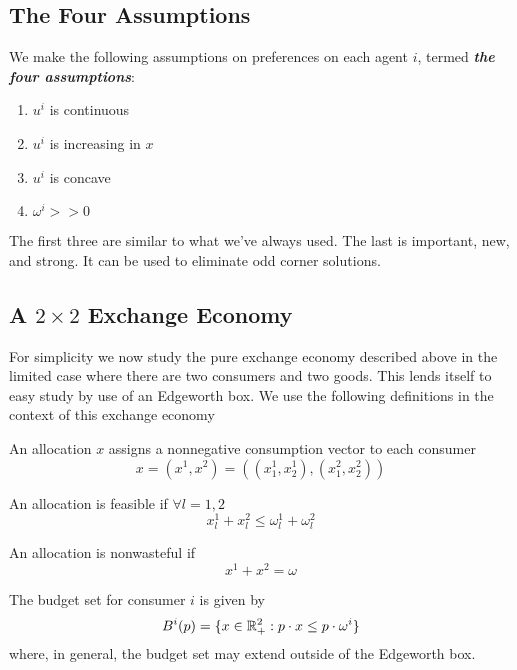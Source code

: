 \subsection{The Four Assumptions}
\label{sec:four-assumptions}

We make the following assumptions on preferences on each agent $i$,
termed \textbf{\textit{the four assumptions}}:

\begin{enumerate}
\item $u^i$ is continuous
\item $u^i$ is increasing in $x$
\item $u^i$ is concave
\item $\omega^i >> 0$
\end{enumerate}

The first three are similar to what we've always used. The last is
important, new, and strong. It can be used to eliminate odd corner
solutions.


\subsection{A $2 \times 2$ Exchange Economy}
\label{sec:2-times-2}


For simplicity we now study the pure exchange economy described above
in the limited case where there are two consumers and two goods. This
lends itself to easy study by use of an Edgeworth box. We use the
following definitions in the context of this exchange economy

\begin{definition}[Allocation]
  An allocation $x$ assigns a nonnegative consumption vector to each consumer
  \[
  x = (x^1, x^2) = ((x^1_1, x^1_2), (x^2_1, x^2_2))
  \]
\end{definition}

\begin{definition}[Feasible]
  An allocation is feasible if $\forall l = 1, 2$
  \[
  x^1_l + x^2_l \leq \omega^1_l + \omega^2_l
  \]
\end{definition}

\begin{definition}
  An allocation is nonwasteful if
  \[
  x^1 + x^2 = \omega
  \]
\end{definition}

\begin{definition}
  The budget set for consumer $i$ is given by
  \[
  B^i(p) = \{x \in {\mathbb R}^2_+: p \cdot x \leq p \cdot \omega^i\}
  \]
  where, in general, the budget set may extend outside of the
  Edgeworth box.
\end{definition}


